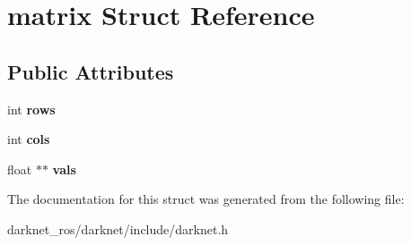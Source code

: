 \hypertarget{structmatrix}{}\section{matrix Struct Reference}
\label{structmatrix}
\subsection*{Public Attributes}
\begin{DoxyCompactItemize}
\item 
\mbox{\label{structmatrix_af83737a5597214de0458c5535a787143}} 
int {\bfseries rows}
\item 
\mbox{\label{structmatrix_a8a250fb537afd000561485dd88281356}} 
int {\bfseries cols}
\item 
\mbox{\label{structmatrix_ac06cdc346e87ea5cb4e4ae1a9b91d61f}} 
float $\ast$$\ast$ {\bfseries vals}
\end{DoxyCompactItemize}


The documentation for this struct was generated from the following file\+:\begin{DoxyCompactItemize}
\item 
darknet\+\_\+ros/darknet/include/darknet.\+h\end{DoxyCompactItemize}
